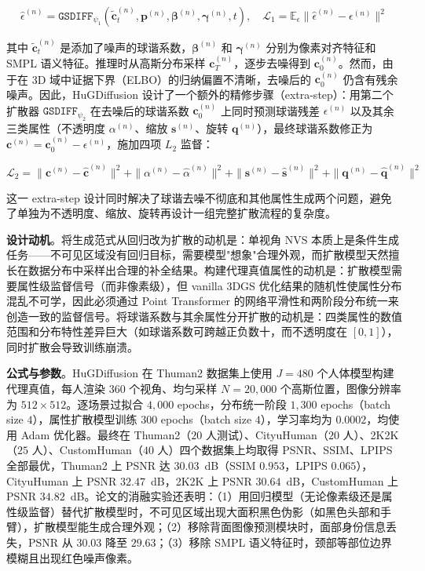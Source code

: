 \begin{equation}
\hat{\epsilon}^{(n)} = \mathtt{GSDIFF}_{\psi_1}(\tilde{\mathbf{c}}_t^{(n)}, \mathbf{p}^{(n)}, \bm{\beta}^{(n)}, \bm{\gamma}^{(n)}, t), \quad \mathcal{L}_1 = \mathbb{E}_\epsilon \|\hat{\epsilon}^{(n)} - \epsilon^{(n)}\|^2
\end{equation}

其中 $\tilde{\mathbf{c}}_t^{(n)}$ 是添加了噪声的球谐系数，$\bm{\beta}^{(n)}$ 和 $\bm{\gamma}^{(n)}$ 分别为像素对齐特征和 SMPL 语义特征。推理时从高斯分布采样 $\mathbf{c}_T^{(n)}$，逐步去噪得到 $\mathbf{c}_0^{(n)}$。然而，由于在 3D 域中证据下界（ELBO）的归纳偏置不清晰，去噪后的 $\mathbf{c}_0^{(n)}$ 仍含有残余噪声。因此，HuGDiffusion 设计了一个额外的精修步骤（extra-step）：用第二个扩散器 $\mathtt{GSDIFF}_{\psi_2}$ 在去噪后的球谐系数 $\mathbf{c}_0^{(n)}$ 上同时预测球谐残差 $\epsilon^{(n)}$ 以及其余三类属性（不透明度 $\alpha^{(n)}$、缩放 $\mathbf{s}^{(n)}$、旋转 $\mathbf{q}^{(n)}$），最终球谐系数修正为 $\mathbf{c}^{(n)} = \mathbf{c}_0^{(n)} - \epsilon^{(n)}$，施加四项 $L_2$ 监督：

\begin{equation}
\mathcal{L}_2 = \|\mathbf{c}^{(n)} - \hat{\mathbf{c}}^{(n)}\|^2 + \|\alpha^{(n)} - \hat{\alpha}^{(n)}\|^2 + \|\mathbf{s}^{(n)} - \hat{\mathbf{s}}^{(n)}\|^2 + \|\mathbf{q}^{(n)} - \hat{\mathbf{q}}^{(n)}\|^2
\end{equation}

这一 extra-step 设计同时解决了球谐去噪不彻底和其他属性生成两个问题，避免了单独为不透明度、缩放、旋转再设计一组完整扩散流程的复杂度。

\textbf{设计动机}。将生成范式从回归改为扩散的动机是：单视角 NVS 本质上是条件生成任务——不可见区域没有回归目标，需要模型"想象"合理外观，而扩散模型天然擅长在数据分布中采样出合理的补全结果。构建代理真值属性的动机是：扩散模型需要属性级监督信号（而非像素级），但 vanilla 3DGS 优化结果的随机性使属性分布混乱不可学，因此必须通过 Point Transformer 的网络平滑性和两阶段分布统一来创造一致的监督信号。将球谐系数与其余属性分开扩散的动机是：四类属性的数值范围和分布特性差异巨大（如球谐系数可跨越正负数十，而不透明度在 $[0,1]$），同时扩散会导致训练崩溃。

\textbf{公式与参数}。HuGDiffusion 在 Thuman2 数据集上使用 $J = 480$ 个人体模型构建代理真值，每人渲染 $360$ 个视角、均匀采样 $N = 20{,}000$ 个高斯位置，图像分辨率为 $512 \times 512$。逐场景过拟合 $4{,}000$ epochs，分布统一阶段 $1{,}300$ epochs（batch size $4$），属性扩散模型训练 $300$ epochs（batch size $4$），学习率均为 $0.0002$，均使用 Adam 优化器。最终在 Thuman2（$20$ 人测试）、CityuHuman（$20$ 人）、2K2K（$25$ 人）、CustomHuman（$40$ 人）四个数据集上均取得 PSNR、SSIM、LPIPS 全部最优，Thuman2 上 PSNR 达 $30.03$~dB（SSIM $0.953$，LPIPS $0.065$），CityuHuman 上 PSNR $32.47$~dB，2K2K 上 PSNR $30.64$~dB，CustomHuman 上 PSNR $34.82$~dB。论文的消融实验还表明：（1）用回归模型（无论像素级还是属性级监督）替代扩散模型时，不可见区域出现大面积黑色伪影（如黑色头部和手臂），扩散模型能生成合理外观；（2）移除背面图像预测模块时，面部身份信息丢失，PSNR 从 $30.03$ 降至 $29.63$；（3）移除 SMPL 语义特征时，颈部等部位边界模糊且出现红色噪声像素。

